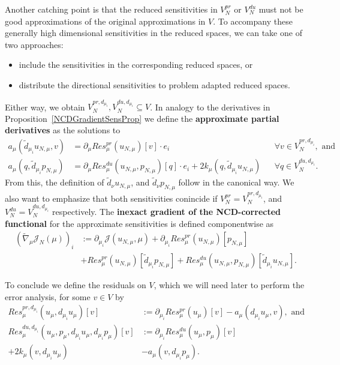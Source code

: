 Another catching point is that the reduced sensitivities in $V_N^{pr}$ or $V_N^{du}$ must not be good approximations of the original approximations in $V$.
To accompany these generally high dimensional sensitivities in the reduced spaces, we can take one of two approaches:
\begin{itemize}
    \item include the sensitivities in the corresponding reduced spaces, or
    \item distribute the directional sensitivities to problem adapted reduced spaces.
\end{itemize}
Either way, we obtain $V_N^{pr, d_{\mu_i}}, V_N^{du, d_{\mu_i}} \subseteq V$.
In analogy to the derivatives in Proposition~\ref{NCDGradientSensProp} we define the \textbf{approximate partial derivatives} as the solutions to
\begin{align*}
    a_\mu(\tilde{d}_{\mu_i} u_{N, \mu}, v) &= \partial_\mu Res_\mu^{pr}(u_{N, \mu})[v] \cdot e_i &&\forall v \in V_N^{pr, d_{\mu_i}}, \text{ and} \\
    a_\mu(q, \tilde{d}_{\mu_i} p_{N, \mu}) &= \partial_\mu Res_\mu^{du}(u_{N, \mu}, p_{N, \mu})[q] \cdot e_i + 2 k_\mu(q, \tilde{d}_{\mu_i} u_{N, \mu}) &&\forall q \in V_N^{du, d_{\mu_i}}.
\end{align*}
From this, the definition of $\tilde{d}_{\nu} u_{N, \mu}$, and $\tilde{d}_{\nu} p_{N, \mu}$ follow in the canonical way.
We also want to emphasize that both sensitivities conincide if $V_N^{pr} = V_N^{pr, d_{\mu_i}}$, and $V_N^{du} = V_N^{du, d_{\mu_i}}$ respectively.
The \textbf{inexact gradient of the NCD-corrected functional} for the approximate sensitivities is defined componentwise as
\begin{align*}
    {\left( \tilde{\nabla}_\mu \mathcal{J}_N(\mu) \right)}_i &:= \partial_{\mu_i} \mathcal{J}(u_{N, \mu}, \mu) + \partial_{\mu_i} Res_\mu^{pr}(u_{N, \mu})[p_{N, \mu}] \\
    &+ Res_\mu^{pr}(u_{N, \mu})[\tilde{d}_{\mu_i} p_{N, \mu}] + Res_\mu^{du}(u_{N, \mu}, p_{N, \mu})[\tilde{d}_{\mu_i} u_{N, \mu}].
\end{align*}

To conclude we define the residuals on $V$, which we will need later to perform the error analysis, for some $v \in V$ by
\begin{align*}
    Res_\mu^{pr, d_{\mu_i}}(u_\mu, d_{\mu_i} u_\mu)[v] &:= \partial_{\mu_i} Res_\mu^{pr}(u_\mu)[v] - a_\mu(d_{\mu_i} u_\mu, v), \text{ and} \\
    Res_\mu^{du, d_{\mu_i}}(u_\mu, p_\mu, d_{\mu_i} u_\mu, d_{\mu_i} p_\mu)[v] &:= \partial_{\mu_i} Res_\mu^{du}(u_\mu, p_\mu)[v] \\
    + 2 k_\mu(v, d_{\mu_i} u_\mu) &- a_\mu(v, d_{\mu_i} p_\mu).
\end{align*}

